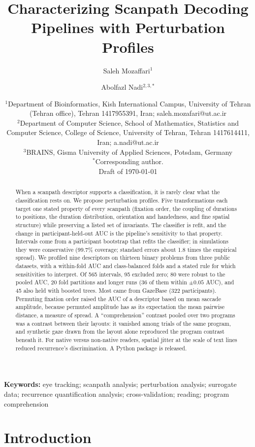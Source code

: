 \documentclass[11pt]{article}
\title{Characterizing Scanpath Decoding Pipelines with Perturbation Profiles}
\author{Saleh Mozaffari$^{1}$ \and Abolfazl Nadi$^{2,3,*}$}
\date{\small $^{1}$Department of Bioinformatics, Kish International Campus, University of Tehran (Tehran office), Tehran 1417955391, Iran; saleh.mozafari@ut.ac.ir\\
$^{2}$Department of Computer Science, School of Mathematics, Statistics and Computer Science, College of Science, University of Tehran, Tehran 1417614411, Iran; a.nadi@ut.ac.ir\\
$^{3}$BRAINS, Gisma University of Applied Sciences, Potsdam, Germany\\
$^{*}$Corresponding author.\\[1ex] Draft of \today}
\begin{document}
\maketitle

\begin{abstract}
\noindent When a scanpath descriptor supports a classification, it is rarely clear what the classification rests on. We propose perturbation profiles. Five transformations each target one stated property of every scanpath (fixation order, the coupling of durations to positions, the duration distribution, orientation and handedness, and fine spatial structure) while preserving a listed set of invariants. The classifier is refit, and the change in participant-held-out AUC is the pipeline's sensitivity to that property. Intervals come from a participant bootstrap that refits the classifier; in simulations they were conservative (99.7\% coverage; standard errors about 1.8 times the empirical spread). We profiled nine descriptors on thirteen binary problems from three public datasets, with a within-fold AUC and class-balanced folds and a stated rule for which sensitivities to interpret. Of 565 intervals, 95 excluded zero; 80 were robust to the pooled AUC, 20 fold partitions and longer runs (36 of them within $\pm 0.05$ AUC), and 45 also held with boosted trees. Most came from GazeBase (322 participants). Permuting fixation order raised the AUC of a descriptor based on mean saccade amplitude, because permuted amplitude has as its expectation the mean pairwise distance, a measure of spread. A ``comprehension'' contrast pooled over two programs was a contrast between their layouts: it vanished among trials of the same program, and synthetic gaze drawn from the layout alone reproduced the program contrast beneath it. For native versus non-native readers, spatial jitter at the scale of text lines reduced recurrence's discrimination. A Python package is released.
\end{abstract}

\noindent\textbf{Keywords:} eye tracking; scanpath analysis; perturbation analysis; surrogate data; recurrence quantification analysis; cross-validation; reading; program comprehension

\section{Introduction}

\end{document}
